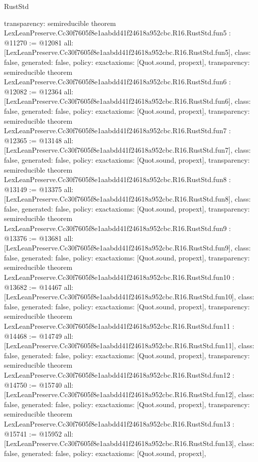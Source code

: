 \begin{lexlean}{RustStd}
\begin{coremodule}
{  transparency: semireducible
}
theorem LexLeanPreserve.Cc30f7605f8e1aabdd41f24618a952cbc.R16.RustStd.fun5 : @11270 := @12081 {
  all: [LexLeanPreserve.Cc30f7605f8e1aabdd41f24618a952cbc.R16.RustStd.fun5],
  class: false,
  generated: false,
  policy: exact{axioms: [Quot.sound, propext]},
  transparency: semireducible
}
theorem LexLeanPreserve.Cc30f7605f8e1aabdd41f24618a952cbc.R16.RustStd.fun6 : @12082 := @12364 {
  all: [LexLeanPreserve.Cc30f7605f8e1aabdd41f24618a952cbc.R16.RustStd.fun6],
  class: false,
  generated: false,
  policy: exact{axioms: [Quot.sound, propext]},
  transparency: semireducible
}
theorem LexLeanPreserve.Cc30f7605f8e1aabdd41f24618a952cbc.R16.RustStd.fun7 : @12365 := @13148 {
  all: [LexLeanPreserve.Cc30f7605f8e1aabdd41f24618a952cbc.R16.RustStd.fun7],
  class: false,
  generated: false,
  policy: exact{axioms: [Quot.sound, propext]},
  transparency: semireducible
}
theorem LexLeanPreserve.Cc30f7605f8e1aabdd41f24618a952cbc.R16.RustStd.fun8 : @13149 := @13375 {
  all: [LexLeanPreserve.Cc30f7605f8e1aabdd41f24618a952cbc.R16.RustStd.fun8],
  class: false,
  generated: false,
  policy: exact{axioms: [Quot.sound, propext]},
  transparency: semireducible
}
theorem LexLeanPreserve.Cc30f7605f8e1aabdd41f24618a952cbc.R16.RustStd.fun9 : @13376 := @13681 {
  all: [LexLeanPreserve.Cc30f7605f8e1aabdd41f24618a952cbc.R16.RustStd.fun9],
  class: false,
  generated: false,
  policy: exact{axioms: [Quot.sound, propext]},
  transparency: semireducible
}
theorem LexLeanPreserve.Cc30f7605f8e1aabdd41f24618a952cbc.R16.RustStd.fun10 : @13682 := @14467 {
  all: [LexLeanPreserve.Cc30f7605f8e1aabdd41f24618a952cbc.R16.RustStd.fun10],
  class: false,
  generated: false,
  policy: exact{axioms: [Quot.sound, propext]},
  transparency: semireducible
}
theorem LexLeanPreserve.Cc30f7605f8e1aabdd41f24618a952cbc.R16.RustStd.fun11 : @14468 := @14749 {
  all: [LexLeanPreserve.Cc30f7605f8e1aabdd41f24618a952cbc.R16.RustStd.fun11],
  class: false,
  generated: false,
  policy: exact{axioms: [Quot.sound, propext]},
  transparency: semireducible
}
theorem LexLeanPreserve.Cc30f7605f8e1aabdd41f24618a952cbc.R16.RustStd.fun12 : @14750 := @15740 {
  all: [LexLeanPreserve.Cc30f7605f8e1aabdd41f24618a952cbc.R16.RustStd.fun12],
  class: false,
  generated: false,
  policy: exact{axioms: [Quot.sound, propext]},
  transparency: semireducible
}
theorem LexLeanPreserve.Cc30f7605f8e1aabdd41f24618a952cbc.R16.RustStd.fun13 : @15741 := @15952 {
  all: [LexLeanPreserve.Cc30f7605f8e1aabdd41f24618a952cbc.R16.RustStd.fun13],
  class: false,
  generated: false,
  policy: exact{axioms: [Quot.sound, propext]},
}
\end{coremodule}
\end{lexlean}
